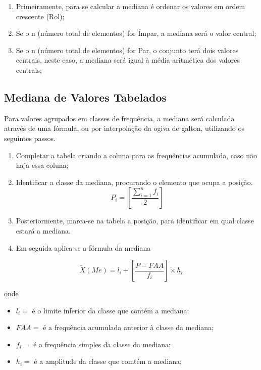 \begin{enumerate}
  \item Primeiramente, para se calcular a mediana é ordenar os valores em ordem crescente (Rol);
  \item Se o n (número total de elementos) for Ímpar, a mediana será o valor central;
  \item Se o n (número total de elementos) for Par, o conjunto terá dois valores centrais, neste caso, a mediana será igual à média aritmética dos valores centrais;
\end{enumerate}




\subsection{Mediana de Valores Tabelados}


Para valores agrupados em classes de frequência, a mediana será calculada através de uma fórmula, ou por interpolação da ogiva de galton, utilizando os seguintes passos.



\begin{enumerate}
\item [{1°)}] Completar a tabela criando a coluna para as frequências acumulada, caso não haja essa coluna;
\item [{2°)}]Identificar a classe da mediana, procurando o elemento que ocupa a posição.
$$ P_{i} = \left[\frac{\sum_{i=1}^{n}f_{i}}{2} \right]  $$
\item [{3°)}] Posteriormente, marca-se na tabela a posição, para identificar em qual classe estará a mediana.
\item [{4°)}] Em seguida aplica-se a fórmula da mediana
\end{enumerate}

\begin{equation}\label{}
    \tilde{X}(Me)=l_{i}+\left[\frac{P-FAA}{f_{i}}\right]\times h_{i}
\end{equation}

 onde

 \begin{itemize}
   \item $l_{i}=$ é o limite inferior da classe que contém a mediana;
   \item $FAA=$ é a frequência acumulada anterior à classe da mediana;
   \item $f_{i}=$ é a frequência simples da classe da mediana;
   \item $h_{i}=$ é a amplitude da classe que comtém a mediana;
 \end{itemize}


